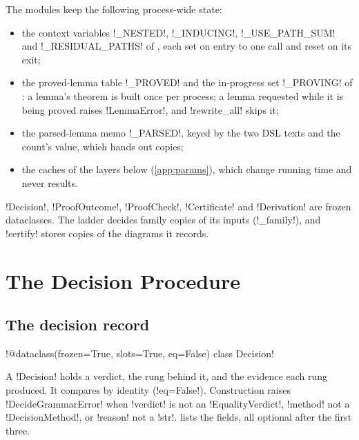 The modules keep the following process-wide state:
\begin{itemize}
\item the context variables \py!_NESTED!, \py!_INDUCING!, \py!_USE_PATH_SUM! and \py!_RESIDUAL_PATHS! of , each set on entry to one call and reset on its exit;
\item the proved-lemma table \py!_PROVED! and the in-progress set \py!_PROVING! of : a lemma's theorem is built once per process; a lemma requested while it is being proved raises \py!LemmaError!, and \py!rewrite_all! skips it;
\item the parsed-lemma memo \py!_PARSED!, keyed by the two DSL texts and the count's value, which hands out copies;
\item the caches of the layers below (\cref{app:params}), which change running time and never results.
\end{itemize}
\py!Decision!, \py!ProofOutcome!, \py!ProofCheck!, \py!Certificate! and \py!Derivation! are frozen dataclasses. The ladder decides family copies of its inputs (\py!_family!), and \py!certify! stores copies of the diagrams it records.

\section{The Decision Procedure}\label{sec:proofs-ladder}

\subsection{The decision record}

\begin{signature}
\py!@dataclass(frozen=True, slots=True, eq=False) class Decision!
\end{signature}

A \py!Decision! holds a verdict, the rung behind it, and the evidence each rung produced. It compares by identity (\py!eq=False!). Construction raises \py!DecideGrammarError! when \py!verdict! is not an \py!EqualityVerdict!, \py!method! not a \py!DecisionMethod!, or \py!reason! not a \py!str!.  lists the fields, all optional after the first three.

